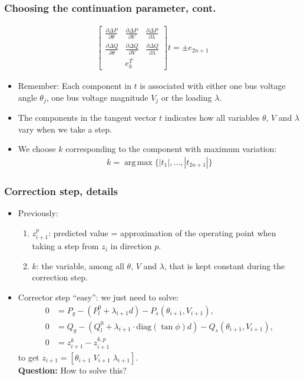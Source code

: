 \documentclass{beamer}
\DeclareMathOperator*{\argmax}{arg\,max}
\begin{document}
\begin{frame}
  \frametitle{Choosing the continuation parameter, cont.}
\begin{align}
  \begin{bmatrix}
  \frac{\partial \Delta P}{\partial \theta} & \frac{\partial \Delta P}{\partial V} & \frac{\partial \Delta P}{\partial \lambda} \\
  \frac{\partial \Delta Q}{\partial \theta} & \frac{\partial \Delta Q}{\partial V} & \frac{\partial \Delta Q}{\partial \lambda} \\
   & e_k^T & 
  \end{bmatrix} t = \pm e_{2n+1}
\end{align}
  \begin{itemize}
  \item Remember: Each component in $t$ is associated with either one bus voltage angle $\theta_j$, one bus voltage magnitude $V_j$ or the loading $\lambda$.
  \item The components in the tangent vector $t$ indicates how all variables $\theta$, $V$ and $\lambda$ vary when we take a step.
  \item We choose $k$ corresponding to the component with maximum variation:
    \begin{align}
      \label{eq:1}
      k = \argmax \{|t_1|,\ldots,|t_{2n+1}|\}
    \end{align}
  \end{itemize}
\end{frame}

\begin{frame}
  \frametitle{Correction step, details}
  \begin{itemize}
  \item Previously:
    \begin{enumerate}
    \item $z_{i+1}^p$: predicted value = approximation of the operating point when taking a step from $z_i$ in direction $p$.
    \item $k$: the variable, among all $\theta$, $V$ and $\lambda$, that is kept constant during the correction step.
    \end{enumerate}
  \item Corrector step ``easy'': we just need to solve:
\begin{align}
      0 &= P_g - (P_l^0 + \lambda_{i+1} d) - P_s(\theta_{i+1},V_{i+1}),\\
      0 &= Q_g - (Q_l^0 + \lambda_{i+1} \cdot \text{diag}(\tan \phi) d)- Q_s(\theta_{i+1},V_{i+1}), \\
      0 &= z_{i+1}^{k}-z_{i+1}^{k,p}
\end{align}
to get $z_{i+1}=[\theta_{i+1} \; V_{i+1} \; \lambda_{i+1}]$.\\
\textbf{Question:} How to solve this? 
  \end{itemize}
\end{frame}
\end{document}
